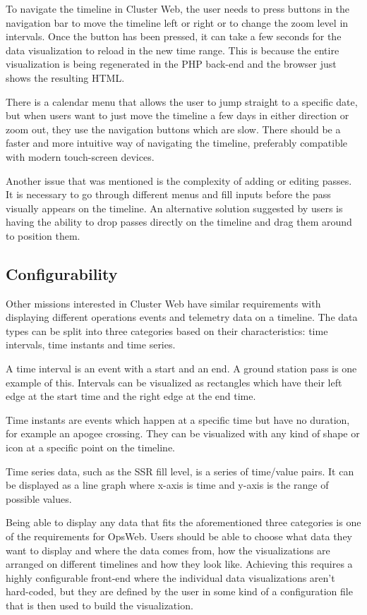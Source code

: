To navigate the timeline in Cluster Web, the user needs to press buttons in the navigation bar to move the timeline left or right or to change the zoom level in intervals. Once the button has been pressed, it can take a few seconds for the data visualization to reload in the new time range. This is because the entire visualization is being regenerated in the PHP back-end and the browser just shows the resulting HTML.

There is a calendar menu that allows the user to jump straight to a specific date, but when users want to just move the timeline a few days in either direction or zoom out, they use the navigation buttons which are slow. There should be a faster and more intuitive way of navigating the timeline, preferably compatible with modern touch-screen devices.

Another issue that was mentioned is the complexity of adding or editing passes. It is necessary to go through different menus and fill inputs before the pass visually appears on the timeline. An alternative solution suggested by users is having the ability to drop passes directly on the timeline and drag them around to position them.

\subsection{Configurability} \label{configurability_req}
Other missions interested in Cluster Web have similar requirements with displaying different operations events and telemetry data on a timeline. The data types can be split into three categories based on their characteristics: time intervals, time instants and time series.

A time interval is an event with a start and an end. A ground station pass is one example of this. Intervals can be visualized as rectangles which have their left edge at the start time and the right edge at the end time.

Time instants are events which happen at a specific time but have no duration, for example an apogee crossing. They can be visualized with any kind of shape or icon at a specific point on the timeline.

Time series data, such as the SSR fill level, is a series of time/value pairs. It can be displayed as a line graph where x-axis is time and y-axis is the range of possible values.

Being able to display any data that fits the aforementioned three categories is one of the requirements for OpsWeb. Users should be able to choose what data they want to display and where the data comes from, how the visualizations are arranged on different timelines and how they look like. Achieving this requires a highly configurable front-end where the individual data visualizations aren't hard-coded, but they are defined by the user in some kind of a configuration file that is then used to build the visualization. 

